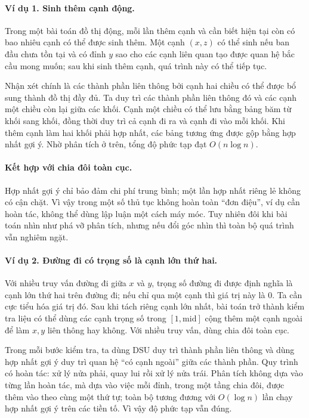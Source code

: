 \documentclass[11pt]{article}
\begin{document}
\paragraph{Ví dụ 1. Sinh thêm cạnh động.}
Trong một bài toán đồ thị động, mỗi lần thêm cạnh và cần biết hiện tại còn có
bao nhiêu cạnh có thể được sinh thêm. Một cạnh \((x,z)\) có thể sinh nếu ban
đầu chưa tồn tại và có đỉnh \(y\) sao cho các cạnh liên quan tạo được quan hệ
bắc cầu mong muốn; sau khi sinh thêm cạnh, quá trình này có thể tiếp tục.

Nhận xét chính là các thành phần liên thông bởi cạnh hai chiều có thể được bổ
sung thành đồ thị đầy đủ. Ta duy trì các thành phần liên thông đó và các cạnh
một chiều còn lại giữa các khối. Cạnh một chiều có thể lưu bằng bảng băm từ
khối sang khối, đồng thời duy trì cả cạnh đi ra và cạnh đi vào mỗi khối. Khi
thêm cạnh làm hai khối phải hợp nhất, các bảng tương ứng được gộp bằng hợp nhất
gợi ý. Nhờ phân tích ở trên, tổng độ phức tạp đạt \(O(n\log n)\).

\paragraph{Kết hợp với chia đôi toàn cục.}
Hợp nhất gợi ý chỉ bảo đảm chi phí trung bình; một lần hợp nhất riêng lẻ không
có cận chặt. Vì vậy trong một số thủ tục không hoàn toàn ``đơn điệu'', ví dụ
cần hoàn tác, không thể dùng lập luận một cách máy móc. Tuy nhiên đôi khi bài
toán nhìn như phá vỡ phân tích, nhưng nếu đổi góc nhìn thì toàn bộ quá trình
vẫn nghiêm ngặt.

\paragraph{Ví dụ 2. Đường đi có trọng số là cạnh lớn thứ hai.}
Với nhiều truy vấn đường đi giữa \(x\) và \(y\), trọng số đường đi được định
nghĩa là cạnh lớn thứ hai trên đường đi; nếu chỉ qua một cạnh thì giá trị này
là \(0\). Ta cần cực tiểu hóa giá trị đó. Sau khi tách riêng cạnh lớn nhất,
bài toán trở thành kiểm tra liệu có thể dùng các cạnh trọng số trong
\([1,\mathrm{mid}]\) cộng thêm một cạnh ngoài để làm \(x,y\) liên thông hay
không. Với nhiều truy vấn, dùng chia đôi toàn cục.

Trong mỗi bước kiểm tra, ta dùng DSU duy trì thành phần liên thông và dùng hợp
nhất gợi ý duy trì quan hệ ``có cạnh ngoài'' giữa các thành phần. Quy trình có
hoàn tác: xử lý nửa phải, quay lui rồi xử lý nửa trái. Phân tích không dựa vào
từng lần hoàn tác, mà dựa vào việc mỗi đỉnh, trong một tầng chia đôi, được thêm
vào theo cùng một thứ tự; toàn bộ tương đương với \(O(\log n)\) lần chạy hợp
nhất gợi ý trên các tiền tố. Vì vậy độ phức tạp vẫn đúng.
\end{document}
